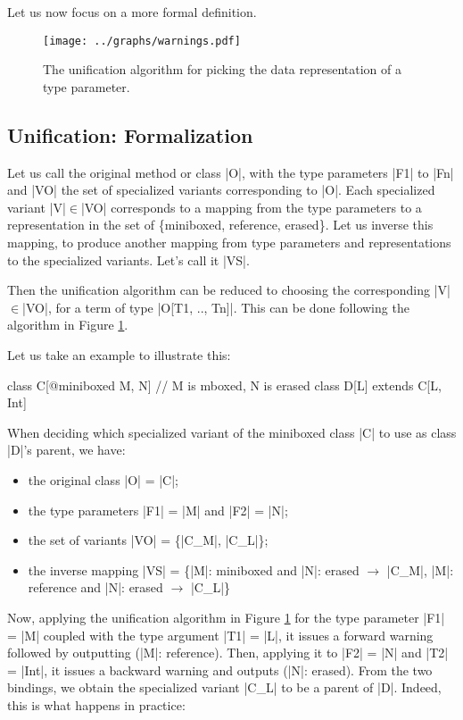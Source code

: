 Let us now focus on a more formal definition.

\begin{figure}[t!]
  \vspace{0.01\textheight}
  \centering
  \texttt{[image: ../graphs/warnings.pdf]}
  \caption{The unification algorithm for picking the data representation of a type parameter.}
  \label{mbox2:fig:algorithm}
\end{figure}

\subsection{Unification: Formalization}

Let us call the original method or class |O|, with the type parameters |F1| to |Fn| and |VO| the set of specialized variants corresponding to |O|. Each specialized variant |V|$\in$|VO| corresponds to a mapping from the type parameters to a representation in the set of \{miniboxed, reference, erased\}. Let us inverse this mapping, to produce another mapping from type parameters and representations to the specialized variants. Let's call it |VS|.

Then the unification algorithm can be reduced to choosing the corresponding |V|$\in$|VO|, for a term of type |O[T1, .., Tn]|. This can be done following the algorithm in Figure \ref{mbox2:fig:algorithm}.

Let us take an example to illustrate this:

\begin{lstlisting-nobreak}
class C[@miniboxed M, N] // M is mboxed, N is erased
class D[L] extends C[L, Int]
\end{lstlisting-nobreak}

When deciding which specialized variant of the miniboxed class |C| to use as class |D|'s parent, we have:
\begin{itemize}
 \item the original class |O| = |C|;
 \item the type parameters |F1| = |M| and |F2| = |N|;
 \item the set of variants |VO| = \{|C_M|, |C_L|\};
 \item the inverse mapping |VS| = \{|M|: miniboxed and |N|: erased $\rightarrow$ |C_M|, |M|: reference and |N|: erased $\rightarrow$ |C_L|\}
\end{itemize}

Now, applying the unification algorithm in Figure \ref{mbox2:fig:algorithm} for the type parameter |F1| = |M| coupled with the type argument |T1| = |L|, it issues a forward warning followed by outputting (|M|: reference). Then, applying it to |F2| = |N| and |T2| = |Int|, it issues a backward warning and outputs (|N|: erased). From the two bindings, we obtain the specialized variant |C_L| to be a parent of |D|. Indeed, this is what happens in practice:

